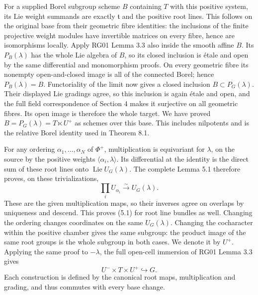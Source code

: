 \documentclass[11pt,a4paper,openany]{report}
\newcounter{none}
\begin{document}
For a supplied Borel subgroup scheme \(B\) containing \(T\) with this positive system, its Lie weight summands are exactly \(\mathfrak t\) and the positive root lines. This follows on the original base from their geometric fibre identities: the inclusions of the finite projective weight modules have invertible matrices on every fibre, hence are isomorphisms locally. Apply RG01 Lemma 3.3 also inside the smooth affine \(B\). Its \(P_B(\lambda)\) has the whole Lie algebra of \(B\), so its closed inclusion is étale and open by the same differential and monomorphism proofs. On every geometric fibre its nonempty open-and-closed image is all of the connected Borel; hence \(P_B(\lambda)=B\). Functoriality of the limit now gives a closed inclusion \(B\subset P_G(\lambda)\). Their displayed Lie gradings agree, so this inclusion is again étale and open, and the full field correspondence of Section 4 makes it surjective on all geometric fibres. Its open image is therefore the whole target. We have proved \(B=P_G(\lambda)=T\ltimes U^+\) as schemes over this base. This includes nilpotents and is the relative Borel identity used in Theorem 8.1.

For any ordering \(\alpha_1,\ldots,\alpha_N\) of \(\Phi^+\), multiplication is equivariant for \(\lambda\), on the source by the positive weights \(\langle\alpha_i,\lambda\rangle\). Its differential at the identity is the direct sum of these root lines onto \(\operatorname{Lie}U_G(\lambda)\). The complete Lemma 5.1 therefore proves, on these trivializations, \[
                 \prod_i U_{\alpha_i}\xrightarrow{\sim}U_G(\lambda).
\tag{5.1}
\] These are the given multiplication maps, so their inverses agree on overlaps by uniqueness and descend. This proves (5.1) for root line bundles as well. Changing the ordering changes coordinates on the same \(U_G(\lambda)\). Changing the cocharacter within the positive chamber gives the same subgroup: the product image of the same root groups is the whole subgroup in both cases. We denote it by \(U^+\). Applying the same proof to \(-\lambda\), the full open-cell immersion of RG01 Lemma 3.3 gives \[
                     U^-\times T\times U^+\hookrightarrow G.
\tag{5.2}
\] Each construction is defined by the canonical root maps, multiplication and grading, and thus commutes with every base change.
\end{document}
